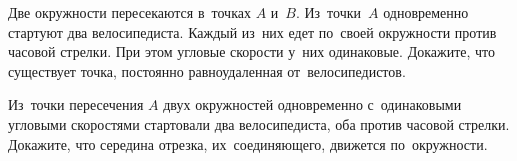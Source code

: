 \begin{problems}
\item
Две окружности пересекаются в~точках $A$ и~$B$.
Из~точки~$A$ одновременно стартуют два велосипедиста.
Каждый из~них едет по~своей окружности против часовой стрелки.
При этом угловые скорости у~них одинаковые.
Докажите, что существует точка, постоянно равноудаленная от~велосипедистов.

\item
Из~точки пересечения $A$ двух окружностей одновременно с~одинаковыми угловыми
скоростями стартовали два велосипедиста, оба против часовой стрелки.
Докажите, что середина отрезка, их~соединяющего, движется по~окружности.

\end{problems}

